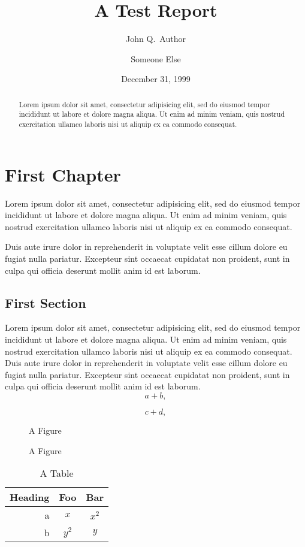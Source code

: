\documentclass{report}
\title{A Test Report}
\author{John Q.~Author\and Someone Else}
\date{December 31, 1999}
\begin{document}
\maketitle

\begin{abstract}
Lorem ipsum dolor sit amet, consectetur adipisicing elit, sed do eiusmod tempor incididunt ut labore et dolore magna aliqua. Ut enim ad minim veniam, quis nostrud exercitation ullamco laboris nisi ut aliquip ex ea commodo consequat. 
\end{abstract}

\chapter{First Chapter}
Lorem ipsum dolor sit amet, consectetur adipisicing elit, sed do eiusmod tempor incididunt ut labore et dolore magna aliqua. Ut enim ad minim veniam, quis nostrud exercitation ullamco laboris nisi ut aliquip ex ea commodo consequat.

Duis aute irure dolor in reprehenderit in voluptate velit esse cillum dolore eu fugiat nulla pariatur. Excepteur sint occaecat cupidatat non proident, sunt in culpa qui officia deserunt mollit anim id est laborum.

\section{First Section}
Lorem ipsum dolor sit amet, consectetur adipisicing elit, sed do eiusmod tempor incididunt ut labore et dolore magna aliqua. Ut enim ad minim veniam, quis nostrud exercitation ullamco laboris nisi ut aliquip ex ea commodo consequat. Duis aute irure dolor in reprehenderit in voluptate velit esse cillum dolore eu fugiat nulla pariatur. Excepteur sint occaecat cupidatat non proident, sunt in culpa qui officia deserunt mollit anim id est laborum.
\begin{equation}
 a + b,
\end{equation}

\begin{equation}
 c + d,
\end{equation}

\begin{figure}
\begin{centering}
A Figure\\
\end{centering}
\caption{A Figure}
\end{figure}

\begin{table}
\begin{centering}
\caption{A Table}
\begin{tabular}{r|cc}
Heading & Foo & Bar\\\hline
a & $x$ & $x^2$\\
b & $y^2$ & $y$\\
\end{tabular}\\
\end{centering}
\end{table}
\end{document}
